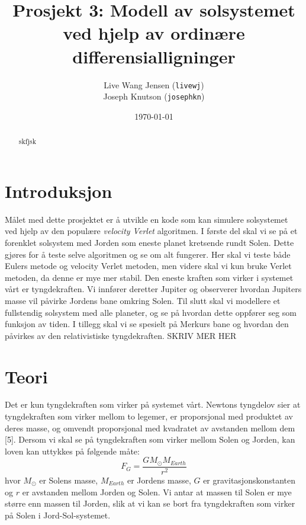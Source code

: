 \documentclass[11pt,a4paper]{article}
\begin{document}
\title{Prosjekt 3: Modell av solsystemet ved hjelp av ordinære differensialligninger }
\author{Live Wang Jensen (\texttt{livewj}) \\ Joseph Knutson (\texttt{josephkn})}
\date{\today}

\maketitle

\begin{abstract}
skfjsk
\end{abstract}

\tableofcontents

\clearpage
\section{Introduksjon}
Målet med dette prosjektet er å utvikle en kode som kan simulere solsystemet ved hjelp av den populære \textit{velocity Verlet} algoritmen. I første del skal vi se på et forenklet solsystem med Jorden som eneste planet kretsende rundt Solen. Dette gjøres for å teste selve algoritmen og se om alt fungerer. Her skal vi teste både Eulers metode og velocity Verlet metoden, men videre skal vi kun bruke Verlet metoden, da denne er mye mer stabil. Den eneste kraften som virker i systemet vårt er tyngdekraften. Vi innfører deretter Jupiter og observerer hvordan Jupiters masse vil påvirke Jordens bane omkring Solen. Til slutt skal vi modellere et fullstendig solsystem med alle planeter, og se på hvordan dette oppfører seg som funksjon av tiden. I tillegg skal vi se spesielt på Merkurs bane og hvordan den påvirkes av den relativistiske tyngdekraften. SKRIV MER HER

\section{Teori}
Det er kun tyngdekraften som virker på systemet vårt. Newtons tyngdelov sier at tyngdekraften som virker mellom to legemer, er proporsjonal med produktet av deres masse, og omvendt proporsjonal med kvadratet av avstanden mellom dem [5]. Dersom vi skal se på tyngdekraften som virker mellom Solen og Jorden, kan loven kan uttykkes på følgende måte:
\begin{equation}
F_G = \frac{GM_{\odot}M_{Earth}}{r^2}
\end{equation}
hvor $M_{\odot}$ er Solens masse, $M_{Earth}$ er Jordens masse, $G$ er gravitasjonskonstanten og $r$ er avstanden mellom Jorden og Solen. Vi antar at massen til Solen er mye større enn massen til Jorden, slik at vi kan se bort fra tyngdekraften som virker på Solen i Jord-Sol-systemet. \\
\end{document}
